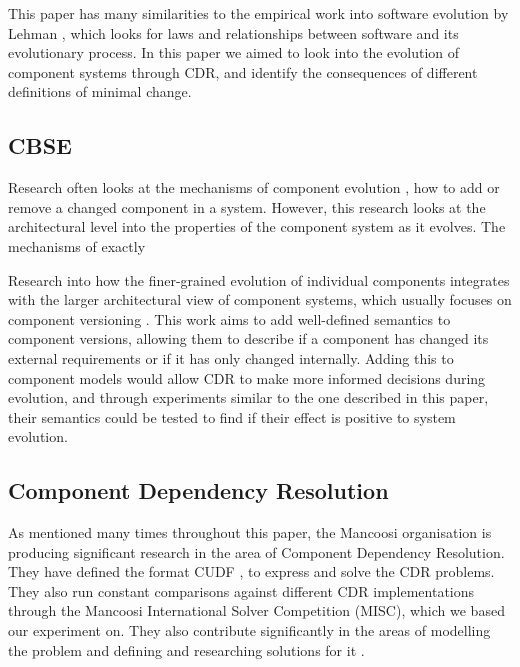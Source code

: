 This paper has many similarities to the empirical work into software evolution by Lehman \citep{lehman1980},
which looks for laws and relationships between software and its evolutionary process.
In this paper we aimed to look into the evolution of component systems through CDR,
and identify the consequences of different definitions of minimal change. 


\subsection{CBSE}

Research often looks at the mechanisms of component evolution \citep{Wang2006}, how to add or remove a changed component in a system.  
However, this research looks at the architectural level into the properties of the component system as it evolves.
The mechanisms of exactly 

Research into how the finer-grained evolution of individual components integrates with the larger architectural view of component systems, which
usually focuses on component versioning \citep{Bauml2009,Stuckenholz2005}.
This work aims to add well-defined semantics to component versions, 
allowing them to describe if a component has changed its external requirements or if it has only changed internally.
Adding this to component models would allow CDR to make more informed decisions during evolution, 
and through experiments similar to the one described in this paper,
their semantics could be tested to find if their effect is positive to system evolution.

\subsection{Component Dependency Resolution}

As mentioned many times throughout this paper, 
the Mancoosi organisation is producing significant research in the area of Component Dependency Resolution.
They have defined the format CUDF \citep{treinen2009common}, to express and solve the CDR problems.
They also run constant comparisons against different CDR implementations through the Mancoosi International Solver Competition (MISC),
which we based our experiment on.
They also contribute significantly in the areas of modelling the problem \citep{Cosmo2010} 
and defining and researching solutions for it \citep{Trezentos2010}.

